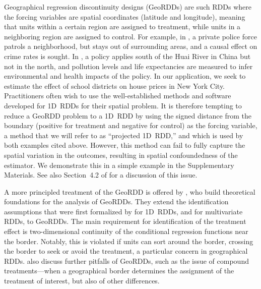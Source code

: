\documentclass[letter,12pt]{article}
\begin{document}
Geographical regression discontinuity designs (GeoRDDs) are such RDDs where the forcing variables are spatial coordinates (latitude and longitude),
meaning that units within a certain region are assigned to treatment, while units in a neighboring region are assigned to control.
For example, in \cite{macdonald2015effect}, a private police force patrols a neighborhood, but stays out of surrounding areas, and a causal effect on crime rates is sought.
In \cite{chen2013evidence}, a policy applies south of the Huai River in China but not in the north, and pollution levels and life expectancies are measured to infer environmental and health impacts of the policy.
In our application, we seek to estimate the effect of school districts on house prices in New York City.
Practitioners often wish to use the well-established methods and software developed for 1D~RDDs for their spatial problem.
It is therefore tempting to reduce a GeoRDD problem to a 1D~RDD by using the signed distance from the boundary (positive for treatment and negative for control) as the forcing variable, a method that we will refer to as ``projected 1D~RDD,'' and which is used by both examples cited above.
However, this method can fail to fully capture the spatial variation in the outcomes, resulting in spatial confoundedness of the estimator.
We demonstrate this in a simple example in the Supplementary Materials.
See also Section~4.2 of \cite{keele_titiunik_2015} for a discussion of this issue.



A more principled treatment of the GeoRDD is offered by \cite{keele_titiunik_2015}, who build theoretical foundations for the analysis of GeoRDDs.
They extend the identification assumptions that were first formalized by \cite{hahn2001identification} for 1D~RDDs, and \cite{imbens2011regression} for multivariate RDDs, to GeoRDDs.
The main requirement for identification of the treatment effect is two-dimensional continuity of the conditional regression functions near the border.
Notably, this is violated if units can sort around the border, crossing the border to seek or avoid the treatment, a particular concern in geographical RDDs.
\cite{keele_titiunik_2015} also discuss further pitfalls of GeoRDDs, such as the issue of compound treatments---when a geographical border determines the assignment of the treatment of interest, but also of other differences.
\end{document}
